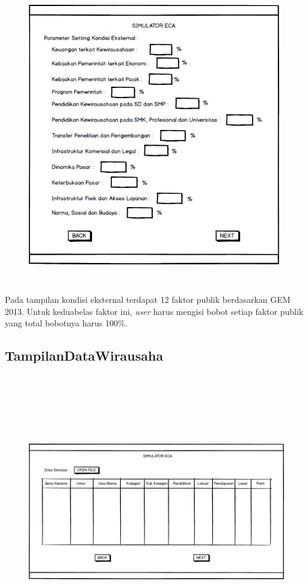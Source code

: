 \begin{figure} [H]
	\centering  
	\includegraphics[width=11cm, height=13cm]{mockup3} 
	\label{fig:kondisiEksternal} 
\end{figure}

Pada tampilan kondisi eksternal terdapat 12 faktor publik berdasarkan GEM 2013. Untuk keduabelas faktor ini, \textit{user} harus mengisi bobot setiap faktor publik yang total bobotnya harus 100\%. 

\subsection{TampilanDataWirausaha}

\begin{figure} [H]
	\centering  
	\includegraphics[width=16cm, height=12cm]{mockup4-1} 
	\label{fig:kondisiDataWirausaha} 
\end{figure}

